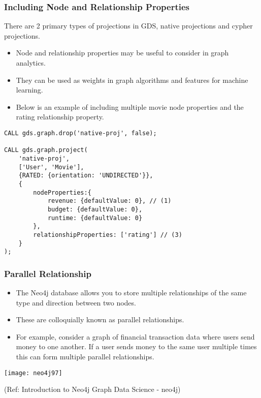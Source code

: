 \begin{frame}[fragile]\frametitle{Including Node and Relationship Properties}

There are 2 primary types of projections in GDS, native projections and cypher projections.

\begin{itemize}
\item Node and relationship properties may be useful to consider in graph analytics. 
\item They can be used as weights in graph algorithms and features for machine learning.
\item Below is an example of including multiple movie node properties and the rating relationship property.
\end{itemize}

\begin{lstlisting}
CALL gds.graph.drop('native-proj', false);

CALL gds.graph.project(
    'native-proj',
    ['User', 'Movie'],
    {RATED: {orientation: 'UNDIRECTED'}},
    {
        nodeProperties:{
            revenue: {defaultValue: 0}, // (1)
            budget: {defaultValue: 0},
            runtime: {defaultValue: 0}
        },
        relationshipProperties: ['rating'] // (3)
    }
);
\end{lstlisting}

\end{frame}

\begin{frame}[fragile]\frametitle{Parallel Relationship}

\begin{itemize}
\item The Neo4j database allows you to store multiple relationships of the same type and direction between two nodes.
\item These are colloquially known as parallel relationships. 
\item For example, consider a graph of financial transaction data where users send money to one another. If a user sends money to the same user multiple times this can form multiple parallel relationships.
\end{itemize}

\begin{center}
\texttt{[image: neo4j97]}
\end{center}	

{\tiny (Ref: Introduction to Neo4j Graph Data Science - neo4j)}
\end{frame}


